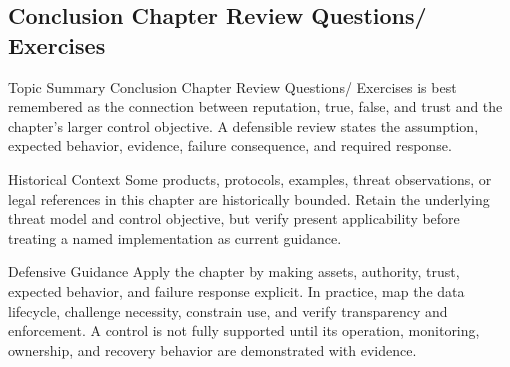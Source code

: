 \documentclass[11pt,letterpaper]{article}
\begin{document}
\subsection*{Conclusion Chapter Review Questions/ Exercises}
\begin{CornellNotesTable}
\end{CornellNotesTable}
\begin{CornellSummaryBox}{Topic Summary}
Conclusion Chapter Review Questions/ Exercises is best remembered as the connection between reputation, true, false, and trust and the chapter's larger control objective. A defensible review states the assumption, expected behavior, evidence, failure consequence, and required response.
\end{CornellSummaryBox}
\begin{CornellWarningBox}{Historical Context}
Some products, protocols, examples, threat observations, or legal references in this chapter are historically bounded. Retain the underlying threat model and control objective, but verify present applicability before treating a named implementation as current guidance.
\end{CornellWarningBox}
\begin{CornellOverviewBox}{Defensive Guidance}
Apply the chapter by making assets, authority, trust, expected behavior, and failure response explicit. In practice, map the data lifecycle, challenge necessity, constrain use, and verify transparency and enforcement. A control is not fully supported until its operation, monitoring, ownership, and recovery behavior are demonstrated with evidence.
\end{CornellOverviewBox}
\end{document}

